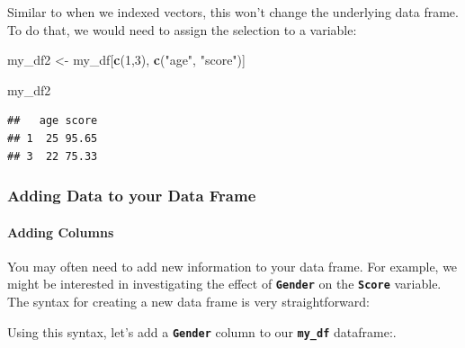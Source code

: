 \documentclass[
]{book}
\newenvironment{Shaded}{\begin{snugshade}}{\end{snugshade}}
\newcommand{\CommentTok}[1]{\textcolor[rgb]{0.56,0.35,0.01}{\textit{#1}}}
\newcommand{\DecValTok}[1]{\textcolor[rgb]{0.00,0.00,0.81}{#1}}
\newcommand{\FunctionTok}[1]{\textcolor[rgb]{0.13,0.29,0.53}{\textbf{#1}}}
\newcommand{\NormalTok}[1]{#1}
\newcommand{\OtherTok}[1]{\textcolor[rgb]{0.56,0.35,0.01}{#1}}
\newcommand{\SpecialCharTok}[1]{\textcolor[rgb]{0.81,0.36,0.00}{\textbf{#1}}}
\newcommand{\StringTok}[1]{\textcolor[rgb]{0.31,0.60,0.02}{#1}}
\begin{document}
Similar to when we indexed vectors, this won't change the underlying data frame. To do that, we would need to assign the selection to a variable:

\begin{Shaded}
\begin{Highlighting}[]
\NormalTok{my\_df2 }\OtherTok{\textless{}{-}}\NormalTok{ my\_df[}\FunctionTok{c}\NormalTok{(}\DecValTok{1}\NormalTok{,}\DecValTok{3}\NormalTok{), }\FunctionTok{c}\NormalTok{(}\StringTok{"age"}\NormalTok{, }\StringTok{"score"}\NormalTok{)]}

\NormalTok{my\_df2}
\end{Highlighting}
\end{Shaded}

\begin{verbatim}
##   age score
## 1  25 95.65
## 3  22 75.33
\end{verbatim}

\subsubsection{Adding Data to your Data Frame}\label{adding-data-to-your-data-frame}

\paragraph{Adding Columns}\label{adding-columns}

You may often need to add new information to your data frame. For example, we might be interested in investigating the effect of \textbf{\texttt{Gender}} on the \textbf{\texttt{Score}} variable. The syntax for creating a new data frame is very straightforward:

\begin{Shaded}
\end{Shaded}

Using this syntax, let's add a \textbf{\texttt{Gender}} column to our \textbf{\texttt{my\_df}} dataframe:.

\begin{Shaded}
\end{Shaded}
\end{document}
